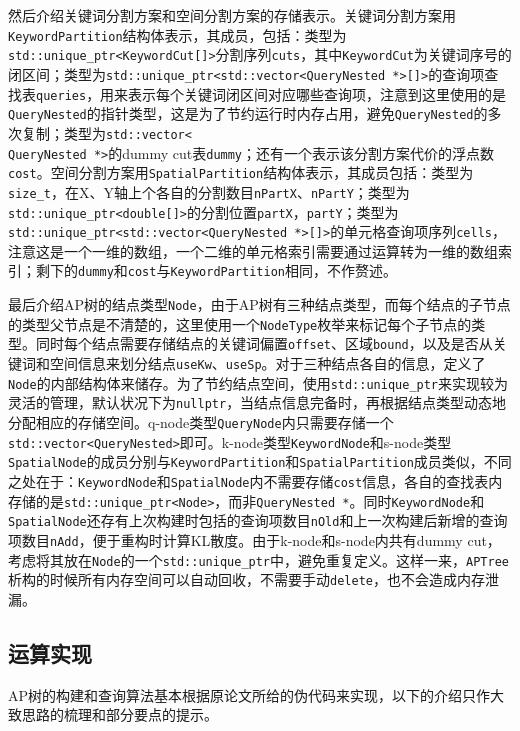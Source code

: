 \documentclass[UTF8]{ctexart}
\begin{document}
然后介绍关键词分割方案和空间分割方案的存储表示。关键词分割方案用\texttt{KeywordPartition}结构体表示，其成员，包括：类型为\texttt{std::unique\_ptr<KeywordCut[]>}分割序列\texttt{cuts}，其中\texttt{KeywordCut}为关键词序号的闭区间；类型为\texttt{std::unique\_ptr<std::vector<QueryNested *>[]>}的查询项查找表\texttt{queries}，用来表示每个关键词闭区间对应哪些查询项，注意到这里使用的是\texttt{QueryNested}的指针类型，这是为了节约运行时内存占用，避免\texttt{QueryNested}的多次复制；类型为\texttt{std::vector<\\QueryNested *>}的dummy cut表\texttt{dummy}；还有一个表示该分割方案代价的浮点数\texttt{cost}。空间分割方案用\texttt{SpatialPartition}结构体表示，其成员包括：类型为\texttt{size\_t}，在X、Y轴上个各自的分割数目\texttt{nPartX}、\texttt{nPartY}；类型为\texttt{std::unique\_ptr<double[]>}的分割位置\texttt{partX}，\texttt{partY}；类型为\texttt{std::unique\_ptr<std::vector<QueryNested *>[]>}的单元格查询项序列\texttt{cells}，注意这是一个一维的数组，一个二维的单元格索引需要通过运算转为一维的数组索引；剩下的\texttt{dummy}和\texttt{cost}与\texttt{KeywordPartition}相同，不作赘述。

最后介绍AP树的结点类型\texttt{Node}，由于AP树有三种结点类型，而每个结点的子节点的类型父节点是不清楚的，这里使用一个\texttt{NodeType}枚举来标记每个子节点的类型。同时每个结点需要存储结点的关键词偏置\texttt{offset}、区域\texttt{bound}，以及是否从关键词和空间信息来划分结点\texttt{useKw}、\texttt{useSp}。对于三种结点各自的信息，定义了\texttt{Node}的内部结构体来储存。为了节约结点空间，使用\texttt{std::unique\_ptr}来实现较为灵活的管理，默认状况下为\texttt{nullptr}，当结点信息完备时，再根据结点类型动态地分配相应的存储空间。q-node类型\texttt{QueryNode}内只需要存储一个\texttt{std::vector<QueryNested>}即可。k-node类型\texttt{KeywordNode}和s-node类型\texttt{SpatialNode}的成员分别与\texttt{KeywordPartition}和\texttt{SpatialPartition}成员类似，不同之处在于：\texttt{KeywordNode}和\texttt{SpatialNode}内不需要存储\texttt{cost}信息，各自的查找表内存储的是\texttt{std::unique\_ptr<Node>}，而非\texttt{QueryNested *}。同时\texttt{KeywordNode}和\texttt{SpatialNode}还存有上次构建时包括的查询项数目\texttt{nOld}和上一次构建后新增的查询项数目\texttt{nAdd}，便于重构时计算KL散度。由于k-node和s-node内共有dummy cut，考虑将其放在\texttt{Node}的一个\texttt{std::unique\_ptr}中，避免重复定义。这样一来，\texttt{APTree}析构的时候所有内存空间可以自动回收，不需要手动\texttt{delete}，也不会造成内存泄漏。

\subsection{运算实现}
AP树的构建和查询算法基本根据原论文所给的伪代码来实现，以下的介绍只作大致思路的梳理和部分要点的提示。
\end{document}
